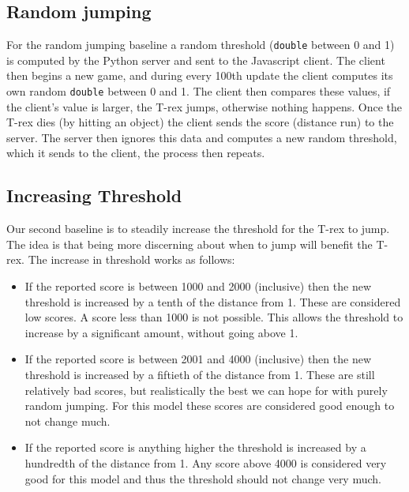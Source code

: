 \documentclass{scrartcl}
\begin{document}
\subsection{Random jumping}
For the random jumping baseline a random threshold (\texttt{double} between 0
and 1) is computed by the Python server and sent to the Javascript client. The
client then begins a new game, and during every 100th update the client computes
its own random \texttt{double} between 0 and 1. The client then compares these
values, if the client's value is larger, the T-rex jumps, otherwise nothing
happens. Once the T-rex dies (by hitting an object) the client sends the score
(distance run) to the server. The server then ignores this data and computes a
new random threshold, which it sends to the client, the process then repeats.

\subsection{Increasing Threshold}
Our second baseline is to steadily increase the threshold for the T-rex to jump.
The idea is that being more discerning about when to jump will benefit the
T-rex. The increase in threshold works as follows:
\begin{itemize}
  \item If the reported score is between 1000 and 2000 (inclusive) then the new
    threshold is increased by a tenth of the distance from 1. These are
    considered low scores. A score less than 1000 is not possible. This allows
    the threshold to increase by a significant amount, without going above 1.
  \item If the reported score is between 2001 and 4000 (inclusive) then the new
    threshold is increased by a fiftieth of the distance from 1. These are still
    relatively bad scores, but realistically the best we can hope for with
    purely random jumping. For this model these scores are considered good
    enough to not change much.
  \item If the reported score is anything higher the threshold is increased by a
    hundredth of the distance from 1. Any score above 4000 is considered very
    good for this model and thus the threshold should not change very much.
\end{itemize}
\end{document}
